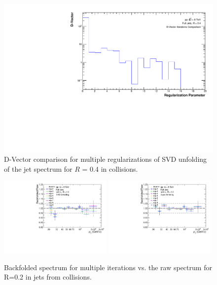 \begin{figure}[hbt!]
    \centering
    \includegraphics[width=15cm]{figures/DVector/DVector_R04.pdf}
    \caption{D-Vector comparison for multiple regularizations of SVD unfolding of the jet spectrum for $R$ = 0.4 in \pp collisions.}
    \label{fig:DVector}
\end{figure}


\begin{figure}[hbt!]
    \centering
    \begin{multicols}{2}
        \includegraphics[width=0.49\textwidth]{figures/UnfoldingComparisons/BackfoldedVsRaw/RatioFoldRawSvd_R02.pdf}
    \vfill\null
    \columnbreak
        \includegraphics[width=0.49\textwidth]{figures/UnfoldingComparisons/BackfoldedVsRaw/RatioFoldRawBayes_R02.pdf}
        \vfill\null
    \end{multicols}
    \caption{Backfolded spectrum for multiple iterations vs. the raw spectrum for R=0.2 in jets from \pp collisions.}
    \label{fig:BackfoldedRaw}
\end{figure}


